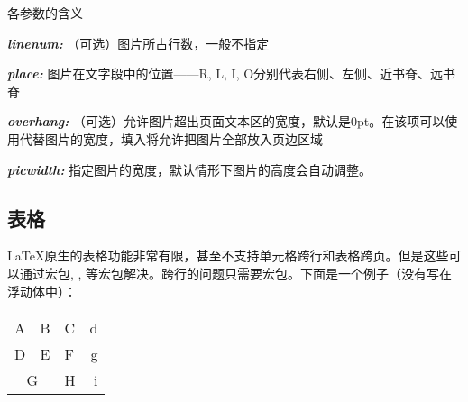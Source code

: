 各参数的含义
\begin{inlinee}
\item {\bfseries\itshape linenum:} （可选）图片所占行数，一般不指定
\item {\bfseries\itshape place:} 图片在文字段中的位置——R, L, I, O分别代表右侧、左侧、近书脊、远书脊
\item {\bfseries\itshape overhang:} （可选）允许图片超出页面文本区的宽度，默认是0pt。在该项可以使用代替图片的宽度，填入将允许把图片全部放入页边区域
\item {\bfseries\itshape picwidth:} 指定图片的宽度，默认情形下图片的高度会自动调整。
\end{inlinee}

\subsection{表格}
\LaTeX 原生的表格功能非常有限，甚至不支持单元格跨行和表格跨页。但是这些可以通过宏包, , 等宏包解决。跨行的问题只需要宏包。下面是一个例子（没有写在浮动体中）：

\begin{codeshow}
\begin{center}
  \begin{tabular}[c]{|l|c||p{3em}
    r@{-}} \hline\hline
    A & B & C & d\\D & E & F & g\\
    \cline{1-2}
    \multicolumn{2}{|c|}{G}&H&i\\
    \hline
  \end{tabular}
\end{center}
\end{codeshow}

